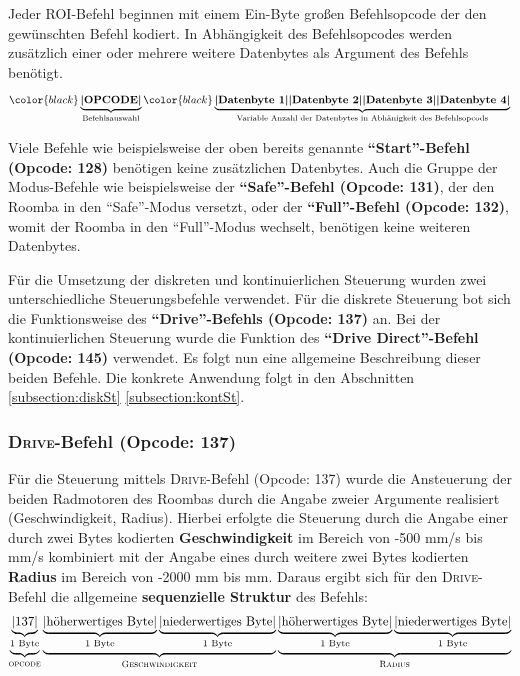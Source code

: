 Jeder ROI-Befehl beginnen mit einem Ein-Byte großen Befehlsopcode der den gewünschten Befehl kodiert. In Abhängigkeit des Befehlsopcodes werden zusätzlich einer oder mehrere weitere Datenbytes als Argument des Befehls benötigt.
\begin{equation*}
\noindent \color{black} \underbrace{\textbf{|OPCODE|}}_{\substack{\text{Befehlsauswahl}}}\hfill \color{black}\underbrace{\textbf{|Datenbyte 1|}\hfill \textbf{|Datenbyte 2|} \hfill \textbf{|Datenbyte 3|}\hfill \textbf{|Datenbyte 4|}}_{\substack{\text{Variable Anzahl der Datenbytes in Abhänigkeit des Befehlsopcods}}} \hfill 
\end{equation*}

Viele Befehle wie beispielsweise der oben bereits genannte \textbf{\enquote{Start}-Befehl (Opcode: 128)} benötigen keine zusätzlichen Datenbytes. Auch die Gruppe der Modus-Befehle wie beispielsweise der \textbf{\enquote{Safe}-Befehl (Opcode: 131)}, der den Roomba in den \enquote{Safe}-Modus versetzt, oder der \textbf{\enquote{Full}-Befehl (Opcode: 132)}, womit der Roomba in den \enquote{Full}-Modus wechselt, benötigen keine weiteren Datenbytes. 

Für die Umsetzung der diskreten und kontinuierlichen Steuerung wurden zwei unterschiedliche Steuerungsbefehle verwendet. Für die diskrete Steuerung bot sich die Funktionsweise des \textbf{\enquote{Drive}-Befehls (Opcode: 137)} an. Bei der kontinuierlichen Steuerung wurde die Funktion des \textbf{\enquote{Drive Direct}-Befehl (Opcode: 145)} verwendet. Es folgt nun eine allgemeine Beschreibung dieser beiden Befehle. Die konkrete Anwendung folgt in den Abschnitten \ref{subsection:diskSt} \bzw \ref{subsection:kontSt}.


\subsubsection{\textsc{Drive}-Befehl (Opcode: 137)}
Für die Steuerung mittels \textsc{Drive}-Befehl (Opcode: 137) wurde die Ansteuerung der beiden Radmotoren des Roombas durch die Angabe zweier Argumente realisiert (Geschwindigkeit, Radius).
Hierbei erfolgte die Steuerung durch die Angabe einer durch zwei Bytes kodierten \textbf{Geschwindigkeit} im Bereich von -500 mm/s bis  mm/s kombiniert mit der Angabe eines durch weitere zwei Bytes kodierten \textbf{Radius} im Bereich von -2000 mm bis  mm. Daraus ergibt sich für den \textsc{Drive}-Befehl die allgemeine \textbf{sequenzielle Struktur} des Befehls:
\begin{equation*}
\begin{split}
\underbrace{\underbrace{\text{|137|}}_{\substack{\text{\text{1 Byte}}}}}_{\substack{\text{\textsc{opcode}}}} \underbrace{\underbrace{\text{|höherwertiges Byte|}}_{\substack{\text{1 Byte}}} \underbrace{\text{|niederwertiges Byte|}}_{\substack{\text{1 Byte}}}}_{\substack{\text{\textsc{Geschwindigkeit}}}} \underbrace{\underbrace{\text{|höherwertiges Byte|}}_{\substack{\text{1 Byte}}} \underbrace{\text{|niederwertiges Byte|}}_{\substack{\text{1 Byte}}}}_{\substack{\text{\textsc{Radius}}}}
\end{split}
\end{equation*}

